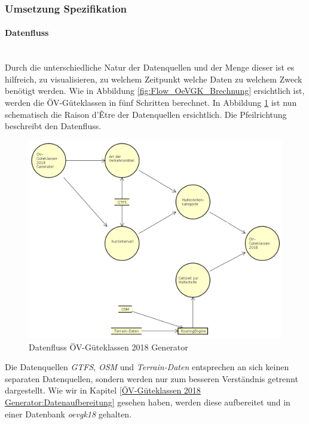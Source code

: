 \subsubsection{Umsetzung Spezifikation}
\label{ÖV-Güteklassen 2018 Generator:Umsetzung Spezifikation}

\paragraph{Datenfluss}~\\
Durch die unterschiedliche Natur der Datenquellen und der Menge dieser ist es hilfreich, zu visualisieren, zu welchem Zeitpunkt welche Daten zu welchem Zweck benötigt werden.
Wie in Abbildung \ref{fig:Flow_OeVGK_Brechnung} ersichtlich ist, werden die \gls{ÖV-Güteklassen} in fünf Schritten berechnet. 
In Abbildung \ref{fig:dataflow_OeV-Gueteklassen_2018_Generator} ist nun schematisch die Raison d’Être der Datenquellen ersichtlich.
Die Pfeilrichtung beschreibt den Datenfluss.

\begin{figure}[ht]
    \centering
    \includegraphics[width=1.0\linewidth]{projectdoc/img/dataflow_OeV-Gueteklassen_2018_Generator.png}
    \caption[Datenfluss ÖV-Güteklassen 2018 Generator]{Datenfluss ÖV-Güteklassen 2018 Generator}
    \label{fig:dataflow_OeV-Gueteklassen_2018_Generator}
\end{figure}

Die Datenquellen \emph{GTFS}, \emph{OSM} und \emph{Terrain-Daten} entsprechen an sich keinen separaten Datenquellen, sondern werden nur zum besseren Verständnis getrennt dargestellt.
Wie wir in Kapitel \ref{ÖV-Güteklassen 2018 Generator:Datenaufbereitung} gesehen haben, werden diese aufbereitet und in einer Datenbank \emph{oevgk18} gehalten.

